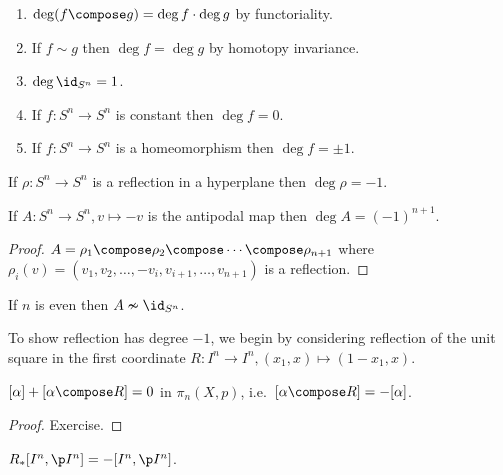 \documentclass[a4paper]{article}
\renewcommand{\b}{\p}
\begin{document}
\begin{proposition}\leavevmode
  \begin{enumerate}
  \item \(\deg (f \compose g) = \deg f \cdot \deg g\) by functoriality.
  \item If \(f \sim g\) then \(\deg f = \deg g\) by homotopy invariance.
  \item \(\deg \id_{S^n} = 1\).
  \item If \(f: S^n \to S^n\) is constant then \(\deg f = 0\).
  \item If \(f: S^n \to S^n\) is a homeomorphism then \(\deg f = \pm 1\).
  \end{enumerate}
\end{proposition}

\begin{proposition}
  \label{prop:degree of reflection of sphere}
  If \(\rho: S^n \to S^n\) is a reflection in a hyperplane then \(\deg \rho = -1\).
\end{proposition}

\begin{corollary}
  If \(A: S^n \to S^n, v \mapsto -v\) is the antipodal map then \(\deg A = (-1)^{n + 1}\).
\end{corollary}

\begin{proof}
  \(A = \rho_1 \compose \rho_2 \compose \cdots \compose \rho_{n + 1}\) where \(\rho_i(v) = (v_1, v_2, \dots, -v_i, v_{i + 1}, \dots, v_{n + 1})\) is a reflection.
\end{proof}

\begin{corollary}
  If \(n\) is even then \(A \nsim \id_{S^n}\).
\end{corollary}

To show reflection has degree \(-1\), we begin by considering reflection of the unit square in the first coordinate \(R: I^n \to I^n, (x_1, x) \mapsto (1 - x_1, x)\).

\begin{lemma}
  \([\alpha] + [\alpha \compose R] = 0\) in \(\pi_n(X, p)\), i.e.\ \([\alpha \compose R] = -[\alpha]\).
\end{lemma}

\begin{proof}
  Exercise.
\end{proof}

\begin{corollary}
  \(R_*[I^n, \b I^n] = -[I^n, \b I^n]\).
\end{corollary}
\end{document}

